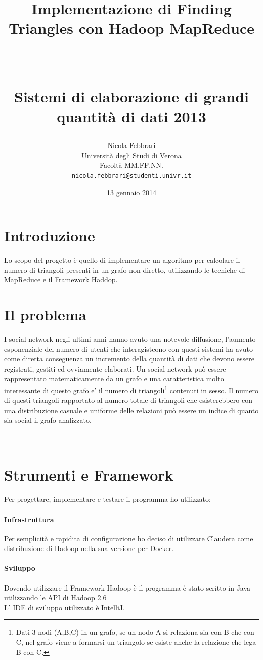 \documentclass[paper=a4, fontsize=11pt]{scrartcl}	%
\title{ \vspace{-1in} 	\usefont{OT1}{bch}{b}{n}
		\huge \strut Implementazione di Finding Triangles con Hadoop MapReduce\strut \\
		\Large \bfseries \strut Sistemi di elaborazione di grandi quantità di dati 2013 \strut
}
\author{ 									\usefont{OT1}{bch}{m}{n}
        Nicola Febbrari\\		\usefont{OT1}{bch}{m}{n}
        Università degli Studi di Verona\\	\usefont{OT1}{bch}{m}{n}
        Facoltà MM.FF.NN.\\
        \texttt{nicola.febbrari@studenti.univr.it}
}
\date{13 gennaio 2014}
\numberwithin{equation}{section}															%
\numberwithin{figure}{section}																%
\numberwithin{table}{section}																%
\begin{document}
\maketitle
\section{Introduzione}
Lo scopo del progetto è quello di implementare un algoritmo per calcolare il numero di triangoli presenti in un grafo non diretto, utilizzando le tecniche di MapReduce e il Framework Haddop.


\section{Il problema}
I social network negli ultimi anni hanno avuto una notevole diffusione, l'aumento esponenziale del numero di utenti che interagistcono con questi sistemi 
ha avuto come diretta conseguenza un  incremento della quantità di dati che devono essere registrati, gestiti ed ovviamente elaborati.
Un social network può essere rappresentato matematicamente da un grafo e una caratteristica molto interessante di questo grafo e' il numero di 
triangoli\footnote{Dati 3 nodi (A,B,C) in un grafo, se un nodo A si relaziona sia con B che con C, nel grafo viene a formarsi un triangolo se esiste anche la relazione che lega B con C.} 
contenuti in sesso. 
Il numero di questi triangoli rapportato al numero totale di triangoli che esisterebbero con una distribuzione casuale e uniforme delle relazioni può essere un indice di quanto sia social il grafo analizzato.\\
\\
\\
\section{Strumenti e Framework}
Per progettare, implementare e testare il programma ho utilizzato:
\paragraph{Infrastruttura}
Per semplicità e rapidita di configurazione ho deciso di utilizzare Claudera come distribuzione di Hadoop nella sua versione per Docker.

\paragraph{Sviluppo}
Dovendo utilizzare il Framework Hadoop è il programma è stato scritto in Java utilizzando le API di Hadoop 2.6\\
L' IDE di sviluppo utilizzato è IntelliJ.  
\end{document}
